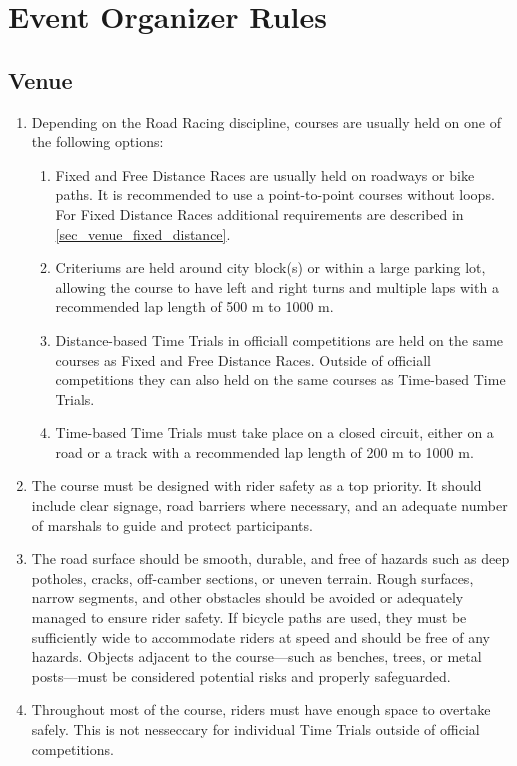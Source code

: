 \chapter{Event Organizer Rules}

\section{Venue}

	\begin{enumerate}[leftmargin=1.5em,labelsep=*]
		\item Depending on the Road Racing discipline, courses are usually held on one of the following options:
		\begin{enumerate}[label*=\arabic*,leftmargin=1.5em,labelsep=*]
			\item Fixed and Free Distance Races are usually held on roadways or bike paths.
			It is recommended to use a point-to-point courses without loops.
			For Fixed Distance Races additional requirements are described in \ref{sec_venue_fixed_distance}.
			\item Criteriums are held around city block(s) or within a large parking lot, allowing the course to have left 
      and right turns and multiple laps with a recommended lap length of 500 m to 1000 m.
			\item Distance-based Time Trials in officiall competitions are held on the same courses as Fixed and Free Distance Races.
			Outside of officiall competitions they can also held on the same courses as Time-based Time Trials.
			\item Time-based Time Trials must take place on a closed circuit, either on a road or a track with a recommended lap length of 200 m to 1000 m.
		\end{enumerate}
		\item The course must be designed with rider safety as a top priority.
		It should include clear signage, road barriers where necessary, and an adequate number of marshals to guide and protect participants.
		\item The road surface should be smooth, durable, and free of hazards such as deep potholes, cracks, off-camber sections, or uneven terrain.
		Rough surfaces, narrow segments, and other obstacles should be avoided or adequately managed to ensure rider safety.
		If bicycle paths are used, they must be sufficiently wide to accommodate riders at speed and should be free of any hazards.
		Objects adjacent to the course—such as benches, trees, or metal posts—must be considered potential risks and properly safeguarded.
		\item Throughout most of the course, riders must have enough space to overtake safely.
		This is not nesseccary for individual Time Trials outside of official competitions.
	\end{enumerate}

